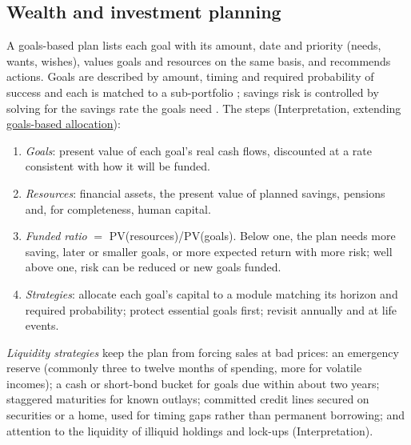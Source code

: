 \subsection{Wealth and investment planning}

\begin{qfmethod}\label{meth:goals-based-financial-plan}
 A goals-based plan lists each goal with its amount, date and priority (needs, wants, wishes), values goals and resources on the same basis, and recommends actions. Goals are described by amount, timing and required probability of success and each is matched to a sub-portfolio \citep[chap.~6, sec.~4, pp.~268--283]{portfolio-management-in-practice-v1-2020}; savings risk is controlled by solving for the savings rate the goals need \citep[pp.~74--75]{ibbotson-lifetime-financial-advice-2007}. The steps (Interpretation, extending \hyperref[meth:goals-based-allocation-heuristics]{goals-based allocation}):
\begin{enumerate}
\item \emph{Goals}: present value of each goal's real cash flows, discounted at a rate consistent with how it will be funded.
\item \emph{Resources}: financial assets, the present value of planned savings, pensions and, for completeness, human capital.
\item \emph{Funded ratio} $=$ PV(resources)/PV(goals). Below one, the plan needs more saving, later or smaller goals, or more expected return with more risk; well above one, risk can be reduced or new goals funded.
\item \emph{Strategies}: allocate each goal's capital to a module matching its horizon and required probability; protect essential goals first; revisit annually and at life events.
\end{enumerate}
\emph{Liquidity strategies} keep the plan from forcing sales at bad prices: an emergency reserve (commonly three to twelve months of spending, more for volatile incomes); a cash or short-bond bucket for goals due within about two years; staggered maturities for known outlays; committed credit lines secured on securities or a home, used for timing gaps rather than permanent borrowing; and attention to the liquidity of illiquid holdings and lock-ups (Interpretation).


\end{qfmethod}
